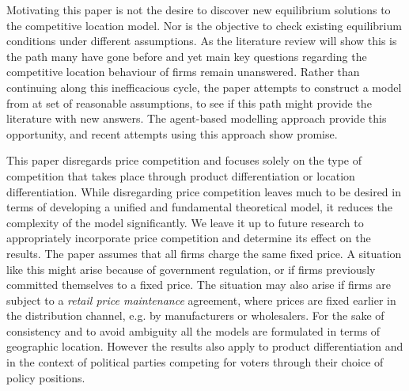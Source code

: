 \documentclass[preprint, 12pt]{elsarticle}
\newcommand*{\TODO}{\textbf{\fbox{??}}}%
\begin{document}
Motivating this paper is not the desire to discover new equilibrium solutions to the competitive location model. Nor is the objective to check existing equilibrium conditions under different assumptions. As the literature review will show this is the path many have gone before and yet main key questions regarding the competitive location behaviour of firms remain unanswered. Rather than continuing along this inefficacious cycle, the paper attempts to construct a model from at set of reasonable assumptions, to see if this path might provide the literature with new answers. The agent-based modelling approach provide this opportunity, and recent attempts using this approach show promise.

This paper disregards price competition and focuses solely on the type of competition that takes place through product differentiation or location differentiation. While disregarding price competition leaves much to be desired in terms of developing a unified and fundamental theoretical model, it reduces the complexity of the model significantly. We leave it up to future research to appropriately incorporate price competition and determine its effect on the results. The paper assumes that all firms charge the same fixed price. A situation like this might arise because of government regulation, or if firms previously committed themselves to a fixed price. The situation may also arise if firms are subject to a \emph{retail price maintenance} agreement, where prices are fixed earlier in the distribution channel, e.g. by manufacturers or wholesalers. For the sake of consistency and to avoid ambiguity all the models are formulated in terms of geographic location. However the results also apply to product differentiation and in the context of political parties competing for voters through their choice of policy positions.

\end{document}
